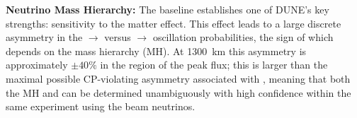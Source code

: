 \textbf{Neutrino Mass Hierarchy:} The  baseline
establishes one of DUNE's key strengths: sensitivity to the matter
effect. This effect leads to a large discrete asymmetry in the
\numu $\to$ \nue versus \anumu $\to$ \anue
oscillation probabilities, the sign of which depends on the mass
hierarchy (MH).  At 1300~km this asymmetry is approximately
$\pm 40\%$ in the region of the peak flux; this is larger than the
maximal possible CP-violating asymmetry associated with \deltacp,
meaning that both the MH and \deltacp can be
determined unambiguously with high confidence within the same
experiment using the beam neutrinos.

